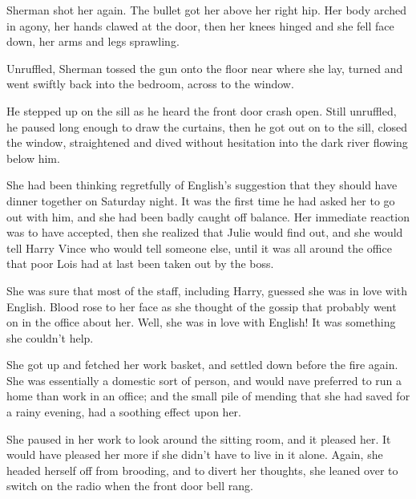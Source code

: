 \documentclass{novel}
\begin{document}
Sherman shot her again. The bullet got her above her right hip. Her body arched in agony, her hands clawed at the door, then her knees hinged and she fell face down, her arms and legs sprawling.

Unruffled, Sherman tossed the gun onto the floor near where she lay, turned and went swiftly back into the bedroom, across to the window.

He stepped up on the sill as he heard the front door crash open. Still unruffled, he paused long enough to draw the curtains, then he got out on to the sill, closed the window, straightened and dived without hesitation into the dark river flowing below him.

\vspace{2\nbs}
\clearpage
\thispagestyle{empty}

\begin{ChapterStart}
\vspace{3\nbs}
\end{ChapterStart}
    
She had been thinking regretfully of English's suggestion that they should have dinner together on Saturday night. It was the first time he had asked her to go out with him, and she had been badly caught off balance. Her immediate reaction was to have accepted, then she realized that Julie would find out, and she would tell Harry Vince who would tell someone else, until it was all around the office that poor Lois had at last been taken out by the boss.

She was sure that most of the staff, including Harry, guessed she was in love with English. Blood rose to her face as she thought of the gossip that probably went on in the office about her. Well, she was in love with English! It was something she couldn't help.

She got up and fetched her work basket, and settled down before the fire again. She was essentially a domestic sort of person, and would nave preferred to run a home than work in an office; and the small pile of mending that she had saved for a rainy evening, had a soothing effect upon her.

She paused in her work to look around the sitting room, and it pleased her. It would have pleased her more if she didn't have to live in it alone. Again, she headed herself off from brooding, and to divert her thoughts, she leaned over to switch on the radio when the front door bell rang.
\end{document}
